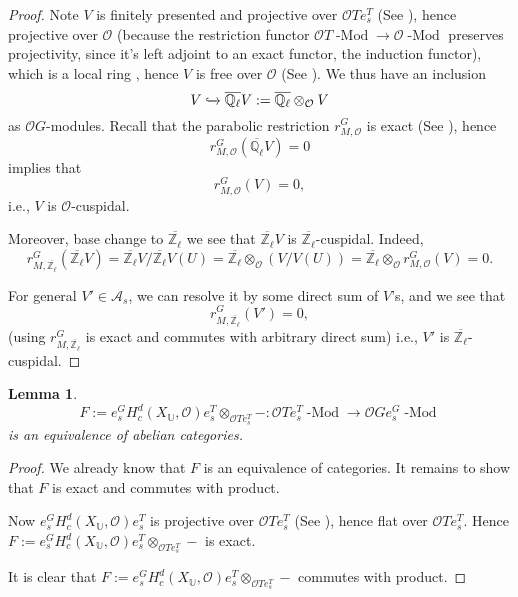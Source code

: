 \documentclass{article}
\newcommand{\red}[1]{\textcolor{red}{#1}}
\newcommand{\blue}[1]{\textcolor{blue}{#1}}
\newtheorem{lemma}{Lemma}
\newcommand{\Modl}{\operatorname{-Mod}}
\begin{document}
\begin{proof}
		Note $V$ is finitely presented and projective over $\mathcal{O}Te_s^T$ (See \cite[Proof of Theorem 3.3]{broue1990isometries}), hence projective over $\mathcal{O}$ (because the restriction functor $\mathcal{O}T\Modl \to \mathcal{O}\Modl$ preserves projectivity, since it's left adjoint to an exact functor, the induction functor), which is a local ring 
		, hence $V$ is free over $\mathcal{O}$ (See \cite[Theorem 24.4.5]{vakil2017rising}). We thus have an inclusion
		$$V \xhookrightarrow[]{} \overline{\mathbb{Q}_{\ell}}V:=\overline{\mathbb{Q}_{\ell}}\otimes_{\mathcal{O}}V %
		$$
		as $\mathcal{O}G$-modules.
		Recall that the parabolic restriction $r^G_{M, \mathcal{O}}$ is exact (See \cite[II.2.1]{vigneras1996representations}), hence 
		$$r^G_{M, \mathcal{O}}(\overline{\mathbb{Q}_{\ell}}V)=0$$
		implies that 
		$$r^G_{M, \mathcal{O}}(V)=0,$$
		i.e., $V$ is $\mathcal{O}$-cuspidal. 
		
		Moreover, base change to $\overline{\mathbb{Z}_{\ell}}$ we see that $\overline{\mathbb{Z}_{\ell}}V$ is $\overline{\mathbb{Z}_{\ell}}$-cuspidal. Indeed, 
		$$r^G_{M, \overline{\mathbb{Z}_{\ell}}}(\overline{\mathbb{Z}_{\ell}}V)=\overline{\mathbb{Z}_{\ell}}V/\overline{\mathbb{Z}_{\ell}}V(U)=\overline{\mathbb{Z}_{\ell}}\otimes_{\mathcal{O}}(V/V(U))=\overline{\mathbb{Z}_{\ell}}\otimes_{\mathcal{O}}r^G_{M, \mathcal{O}}(V)=0.$$
		
		For general $V' \in \mathcal{A}_s$, we can resolve it by some direct sum of $V$'s, and we see that
		$$r^G_{M, \overline{\mathbb{Z}_{\ell}}}(V')=0,$$
		(using $r^G_{M, \overline{\mathbb{Z}_{\ell}}}$ is exact and commutes with arbitrary direct sum) i.e., $V'$ is $\overline{\mathbb{Z}_{\ell}}$-cuspidal.
	\end{proof}
	

	

	
	\begin{lemma}\label{Lem abelian}
		$$F:=e_s^GH^d_c(X_{\mathbb{U}}, \mathcal{O})e_s^T\otimes_{\mathcal{O}Te_s^T}-: \mathcal{O}Te_s^T\Modl \to \mathcal{O}Ge_s^G\Modl$$ is an equivalence of abelian categories.
	\end{lemma}
	
	\begin{proof}
		We already know that $F$ is an equivalence of categories. It remains to show that $F$ is exact and commutes with product.
		
		Now $e_s^GH^d_c(X_{\mathbb{U}}, \mathcal{O})e_s^T$ is projective over ${\mathcal{O}Te_s^T}$ (See \cite[Proof of Theorem 3.3]{broue1990isometries}), hence flat over ${\mathcal{O}Te_s^T}$. Hence $F:=e_s^GH^d_c(X_{\mathbb{U}}, \mathcal{O})e_s^T\otimes_{\mathcal{O}Te_s^T}-$ is exact.
		
		It is clear that $F:=e_s^GH^d_c(X_{\mathbb{U}}, \mathcal{O})e_s^T\otimes_{\mathcal{O}Te_s^T}-$ commutes with product.
	\end{proof}
\end{document}
